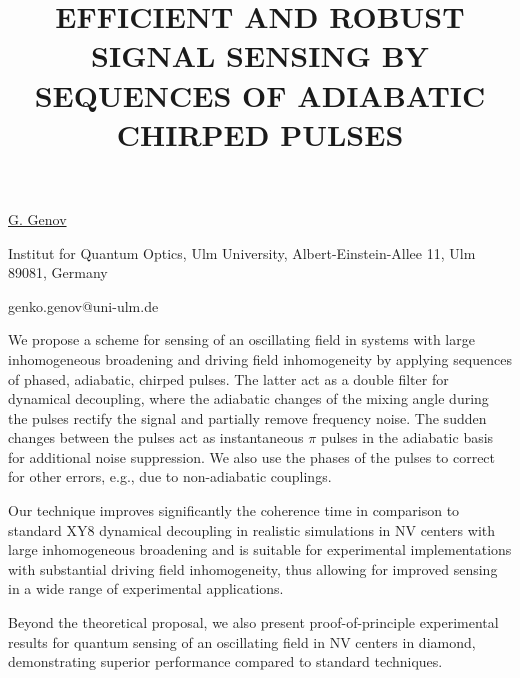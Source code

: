 \title{EFFICIENT AND ROBUST SIGNAL SENSING BY SEQUENCES OF ADIABATIC CHIRPED PULSES}

\underline{G. Genov} 

{\normalsize{\vspace{-4mm}
Institut for Quantum Optics, Ulm University, Albert-Einstein-Allee 11, Ulm 89081, Germany



\email genko.genov@uni-ulm.de}}

We propose a scheme for sensing of an oscillating field in systems with large inhomogeneous broadening and driving field inhomogeneity by applying sequences of phased, adiabatic, chirped pulses. The latter act as a double filter for dynamical decoupling, where the adiabatic changes of the mixing angle during the pulses rectify the signal and partially remove frequency noise. The sudden changes between the pulses act as instantaneous $\pi$ pulses in the adiabatic basis for additional noise suppression. We also use the phases of the pulses to correct for other errors, e.g., due to non-adiabatic couplings.

Our technique improves significantly the coherence time in comparison to standard XY8 dynamical decoupling in realistic simulations in NV centers with large inhomogeneous broadening and is suitable for experimental implementations with substantial driving field inhomogeneity, thus allowing for improved sensing in a wide range of experimental applications.

Beyond the theoretical proposal, we also present proof-of-principle experimental results for quantum sensing of an oscillating field in NV centers in diamond, demonstrating superior performance compared to standard techniques.


\vspace{\baselineskip}